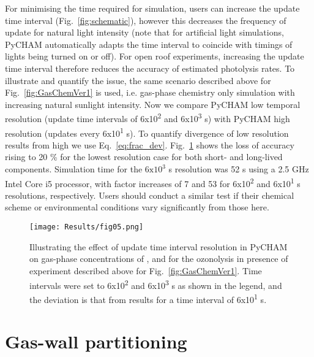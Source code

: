 \documentclass[gmd, manuscript]{copernicus}
\begin{document}
For minimising the time required for simulation, users can increase the update time interval (Fig.~\ref{fig:schematic}), however this decreases the frequency of update for natural light intensity (note that for artificial light simulations, PyCHAM automatically adapts the time interval to coincide with timings of lights being turned on or off).  For open roof experiments, increasing the update time interval therefore reduces the accuracy of estimated photolysis rates.  To illustrate and quantify the issue, the same scenario described above for Fig.~\ref{fig:GasChemVer1} is used, i.e. gas-phase chemistry only simulation with increasing natural sunlight intensity.  Now we compare PyCHAM low temporal resolution (update time intervals of \unit{6x10^2} and \unit{6x10^3} s) with PyCHAM high resolution (updates every \unit{6x10^1} s).  To quantify divergence of low resolution results from high we use Eq.~\ref{eq:frac_dev}.  Fig.~\ref{fig:GasChemTimeRes} shows the loss of accuracy rising to 20 \% for the lowest resolution case for both short- and long-lived components.  Simulation time for the $\mathrm{6x10^3}$ s resolution was 52 s using a 2.5 GHz Intel Core i5 processor, with factor increases of 7 and 53 for \unit{6x10^2} and \unit{6x10^1} s resolutions, respectively.  Users should conduct a similar test if their chemical scheme or environmental conditions vary significantly from those here.

\begin{figure}[t]
\texttt{[image: Results/fig05.png]}
\caption{Illustrating the effect of update time interval resolution in PyCHAM on gas-phase concentrations of ,  and  for the  ozonolysis in presence of  experiment described above for Fig.~\ref{fig:GasChemVer1}.  Time intervals were set to \unit{6x10^2} and \unit{6x10^3} s as shown in the legend, and the deviation is that from results for a time interval of \unit{6x10^1} s.}
\label{fig:GasChemTimeRes}
\end{figure}

\section{Gas-wall partitioning}\label{sec:wallpart}
\end{document}

